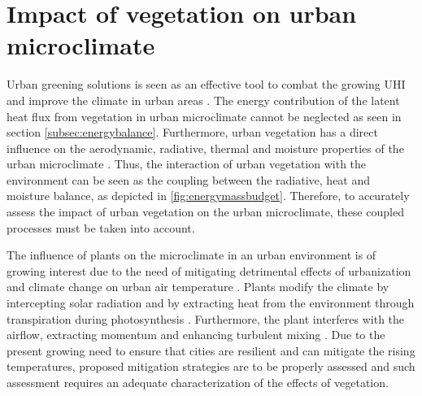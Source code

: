\section{Impact of vegetation on urban microclimate}

Urban greening solutions is seen as an effective tool to combat the growing UHI and improve the climate in urban areas \citep{Gillner2015, Bowler2010, Loughner2012}.  The energy contribution of the latent heat flux from vegetation in urban microclimate cannot be neglected as seen in section \ref{subsec:energybalance}. Furthermore, urban vegetation has a direct influence on the aerodynamic, radiative, thermal and moisture properties of the urban microclimate \citep{Oke1989}. Thus, the interaction of urban vegetation with the environment can be seen as the coupling between the radiative, heat and moisture balance, as depicted in \cref{fig:energymassbudget}. Therefore, to accurately assess the impact of urban vegetation on the urban microclimate, these coupled processes must be taken into account.
	
The influence of plants on the microclimate in an urban environment is of growing interest due to the need of mitigating detrimental effects of urbanization and climate change on urban air temperature \citep{Chen2006,Demuzere2014,Dimoudi2003,Matthews2017,Shashua-Bar2009b,Shashua-Bar2000a}. Plants modify the climate by intercepting solar radiation and by extracting heat from the environment through transpiration during photosynthesis \citep{nobel2009physicochemical}. Furthermore, the plant interferes with the airflow, extracting momentum and enhancing turbulent mixing \citep{Finnigan2009, Gromke2014, Sanz2003}. Due to the present growing need to ensure that cities are resilient and can mitigate the rising temperatures, proposed mitigation strategies are to be properly assessed and such assessment requires an adequate characterization of the effects of vegetation. 
	
